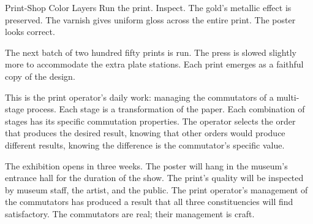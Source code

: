 \begin{coda}{Print-Shop Color Layers}
Run the print. Inspect. The gold's metallic effect is preserved.
The varnish gives uniform gloss across the entire print. The
poster looks correct.

The next batch of two hundred fifty prints is run. The press is
slowed slightly more to accommodate the extra plate stations.
Each print emerges as a faithful copy of the design.

This is the print operator's daily work: managing the commutators
of a multi-stage process. Each stage is a transformation of the
paper. Each combination of stages has its specific commutation
properties. The operator selects the order that produces the
desired result, knowing that other orders would produce different
results, knowing the difference is the commutator's specific
value.

The exhibition opens in three weeks. The poster will hang in the
museum's entrance hall for the duration of the show. The print's
quality will be inspected by museum staff, the artist, and the
public. The print operator's management of the commutators has
produced a result that all three constituencies will find
satisfactory. The commutators are real; their management is craft.

\end{coda}

